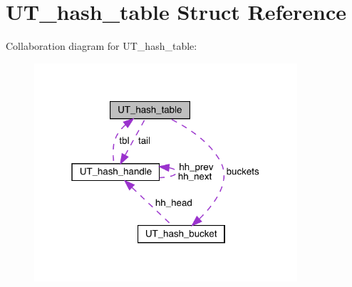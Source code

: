 \hypertarget{struct_u_t__hash__table}{}\section{U\+T\+\_\+hash\+\_\+table Struct Reference}
\label{struct_u_t__hash__table}


Collaboration diagram for U\+T\+\_\+hash\+\_\+table\+:\nopagebreak
\begin{figure}[H]
\begin{center}
\leavevmode
\includegraphics[width=277pt]{struct_u_t__hash__table__coll__graph}
\end{center}
\end{figure}
